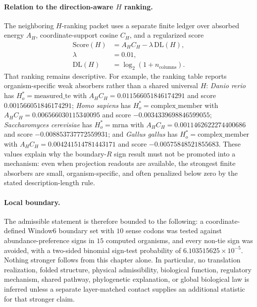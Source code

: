 \paragraph{Relation to the direction-aware $H$ ranking.}
The neighboring $H$-ranking packet uses a separate finite ledger over absorbed energy $A_H$, coordinate-support cosine $C_H$, and a regularized score
$$
\begin{aligned}
 \mathrm{Score}(H) &= A_H C_H - \lambda\,\mathrm{DL}(H),\\
 \lambda &= 0.01,\\
 \mathrm{DL}(H) &= \log_2(1+n_{\mathrm{columns}}).
\end{aligned}
$$
That ranking remains descriptive.  For example, the ranking table reports organism-specific weak absorbers rather than a shared universal $H$: \emph{Danio rerio} has $H_o^*=\mathrm{measured\_te}$ with $A_H C_H=0.011566051846174291$ and score $0.001566051846174291$; \emph{Homo sapiens} has $H_o^*=\mathrm{complex\_member}$ with $A_H C_H=0.006566030115340095$ and score $-0.0034339698846599055$; \emph{Saccharomyces cerevisiae} has $H_o^*=\mathrm{mrna}$ with $A_H C_H=0.0011462622274400686$ and score $-0.008853737772559931$; and \emph{Gallus gallus} has $H_o^*=\mathrm{complex\_member}$ with $A_H C_H=0.004241514781443171$ and score $-0.00575848521855683$.  These values explain why the boundary-$R$ sign result must not be promoted into a mechanism: even when projection readouts are available, the strongest finite absorbers are small, organism-specific, and often penalized below zero by the stated description-length rule.

\paragraph{Local boundary.}
The admissible statement is therefore bounded to the following: a coordinate-defined Window6 boundary set with $10$ sense codons was tested against abundance-preference signs in $15$ computed organisms, and every non-tie sign was avoided, with a two-sided binomial sign-test probability of $6.103515625\times 10^{-5}$.  Nothing stronger follows from this chapter alone.  In particular, no translation realization, folded structure, physical admissibility, biological function, regulatory mechanism, shared pathway, phylogenetic explanation, or global biological law is inferred unless a separate layer-matched contact supplies an additional statistic for that stronger claim.